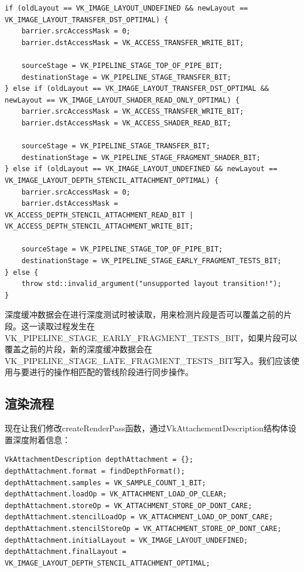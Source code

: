 \documentclass{ctexart}
\begin{document}
\begin{lstlisting}[language={[ANSI]C}]
if (oldLayout == VK_IMAGE_LAYOUT_UNDEFINED && newLayout == VK_IMAGE_LAYOUT_TRANSFER_DST_OPTIMAL) {
	barrier.srcAccessMask = 0;
	barrier.dstAccessMask = VK_ACCESS_TRANSFER_WRITE_BIT;

	sourceStage = VK_PIPELINE_STAGE_TOP_OF_PIPE_BIT;
	destinationStage = VK_PIPELINE_STAGE_TRANSFER_BIT;
} else if (oldLayout == VK_IMAGE_LAYOUT_TRANSFER_DST_OPTIMAL && newLayout == VK_IMAGE_LAYOUT_SHADER_READ_ONLY_OPTIMAL) {
	barrier.srcAccessMask = VK_ACCESS_TRANSFER_WRITE_BIT;
	barrier.dstAccessMask = VK_ACCESS_SHADER_READ_BIT;

	sourceStage = VK_PIPELINE_STAGE_TRANSFER_BIT;
	destinationStage = VK_PIPELINE_STAGE_FRAGMENT_SHADER_BIT;
} else if (oldLayout == VK_IMAGE_LAYOUT_UNDEFINED && newLayout == VK_IMAGE_LAYOUT_DEPTH_STENCIL_ATTACHMENT_OPTIMAL) {
	barrier.srcAccessMask = 0;
	barrier.dstAccessMask = VK_ACCESS_DEPTH_STENCIL_ATTACHMENT_READ_BIT | VK_ACCESS_DEPTH_STENCIL_ATTACHMENT_WRITE_BIT;

	sourceStage = VK_PIPELINE_STAGE_TOP_OF_PIPE_BIT;
	destinationStage = VK_PIPELINE_STAGE_EARLY_FRAGMENT_TESTS_BIT;
} else {
	throw std::invalid_argument("unsupported layout transition!");
}
\end{lstlisting}

深度缓冲数据会在进行深度测试时被读取，用来检测片段是否可以覆盖之前的片段。这一读取过程发生在VK\_PIPELINE\_STAGE\_EARLY\_FRAGMENT\_TESTS\_BIT，如果片段可以覆盖之前的片段，新的深度缓冲数据会在VK\_PIPELINE\_STAGE\_LATE\_FRAGMENT\_TESTS\_BIT写入。我们应该使用与要进行的操作相匹配的管线阶段进行同步操作。

\subsection{渲染流程}

现在让我们修改createRenderPass函数，通过VkAttachementDescription结构体设置深度附着信息：

\begin{lstlisting}[language={[ANSI]C}]
VkAttachmentDescription depthAttachment = {};
depthAttachment.format = findDepthFormat();
depthAttachment.samples = VK_SAMPLE_COUNT_1_BIT;
depthAttachment.loadOp = VK_ATTACHMENT_LOAD_OP_CLEAR;
depthAttachment.storeOp = VK_ATTACHMENT_STORE_OP_DONT_CARE;
depthAttachment.stencilLoadOp = VK_ATTACHMENT_LOAD_OP_DONT_CARE;
depthAttachment.stencilStoreOp = VK_ATTACHMENT_STORE_OP_DONT_CARE;
depthAttachment.initialLayout = VK_IMAGE_LAYOUT_UNDEFINED;
depthAttachment.finalLayout = VK_IMAGE_LAYOUT_DEPTH_STENCIL_ATTACHMENT_OPTIMAL;
\end{lstlisting}
\end{document}
